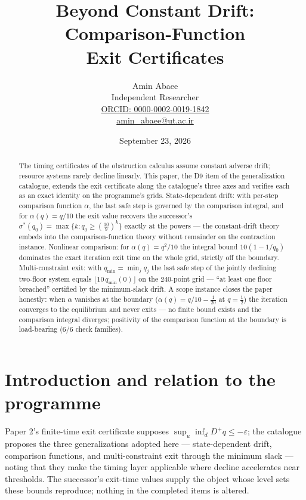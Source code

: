 \documentclass[10pt,twocolumn]{article}
\theoremstyle{definition}
\begin{document}
\title{Beyond Constant Drift: Comparison-Function\\ Exit Certificates}
\author{Amin Abaee\\[0.35em]
{\small Independent Researcher}\\[0.55em]
{\small\href{https://orcid.org/0000-0002-0019-1842}{ORCID: 0000-0002-0019-1842}}\\[0.3em]
{\small\href{mailto:amin\_abaee@ut.ac.ir}{amin\_abaee@ut.ac.ir}}}
\date{September 23, 2026}
\maketitle

\begin{abstract}
The timing certificates of the obstruction calculus assume constant adverse
drift; resource systems rarely decline linearly. This paper, the D9 item of
the generalization catalogue, extends the exit certificate along the
catalogue's three axes and verifies each as an exact identity on the
programme's grids. State-dependent drift: with per-step comparison function
$\alpha$, the last safe step is governed by the comparison integral, and
for $\alpha(q)=q/10$ the exit value recovers the successor's
$\sigma^\ast(q_0)=\max\{k: q_0\ge(\tfrac{10}9)^k\}$ exactly at the powers
--- the constant-drift theory embeds into the comparison-function theory
without remainder on the contraction instance. Nonlinear comparison: for
$\alpha(q)=q^2/10$ the integral bound $10(1-1/q_0)$ dominates the exact
iteration exit time on the whole grid, strictly off the boundary.
Multi-constraint exit: with $q_{\min}=\min_j q_j$ the last safe step of the
jointly declining two-floor system equals $\lfloor 10\,q_{\min}(0)\rfloor$
on the $240$-point grid --- ``at least one floor breached'' certified by the
minimum-slack drift. A scope instance closes the paper honestly: when
$\alpha$ vanishes at the boundary ($\alpha(q)=q/10-\tfrac1{20}$ at
$q=\tfrac12$) the iteration converges to the equilibrium and never exits
--- no finite bound exists and the comparison integral diverges; positivity
of the comparison function at the boundary is load-bearing (6/6 check
families).
\end{abstract}

\section{Introduction and relation to the programme}

Paper 2's finite-time exit certificate supposes
$\sup_u\inf_d D^+q\le-\varepsilon$; the catalogue proposes the three
generalizations adopted here --- state-dependent drift, comparison
functions, and multi-constraint exit through the minimum slack --- noting
that they make the timing layer applicable where decline accelerates near
thresholds. The successor's exit-time values supply the object whose level
sets these bounds reproduce; nothing in the completed items is altered.
\end{document}
